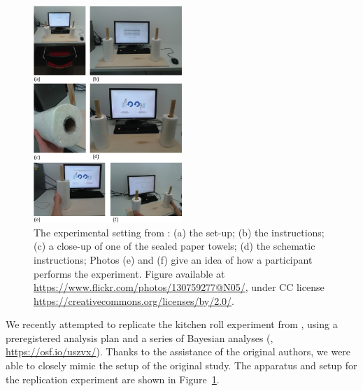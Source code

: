 \begin{figure}[!t]
    \begin{center}
        \includegraphics[width=0.5\textwidth]{figs/bi2_KitchenRollsSetup.eps}
        \caption{The experimental setting from \protect {}: (a) the set-up; (b) the instructions; (c) a close-up of one of the sealed paper towels; (d) the schematic instructions; Photos (e) and (f) give an idea of how a participant performs the experiment. Figure available at \protect \url{https://www.flickr.com/photos/130759277@N05/}, under CC license \protect \url{https://creativecommons.org/licenses/by/2.0/}.}\label{fig:bi2:KitchenRollsSetUp}
    \end{center}
\end{figure}


We recently attempted to replicate the kitchen roll experiment from , using a preregistered analysis plan and a series of Bayesian analyses (, \url{https://osf.io/uszvx/}). Thanks to the assistance of the original authors, we were able to closely mimic the setup of the original study. The apparatus and setup for the replication experiment are shown in Figure~\ref{fig:bi2:KitchenRollsSetUp}.

